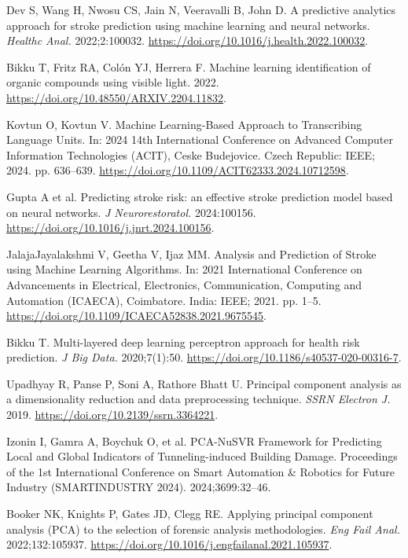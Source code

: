 \begin{enumerate}[label={[\arabic*]},leftmargin=1.2cm]
\item \hypertarget{bib:1}{}Dev S, Wang H, Nwosu CS, Jain N, Veeravalli B, John D. A predictive analytics approach for stroke prediction using machine learning and neural networks. \textit{Healthc Anal.} 2022;2:100032. \url{https://doi.org/10.1016/j.health.2022.100032}.
\item \hypertarget{bib:2}{}Bikku T, Fritz RA, Colón YJ, Herrera F. Machine learning identification of organic compounds using visible light. 2022. \url{https://doi.org/10.48550/ARXIV.2204.11832}.
\item \hypertarget{bib:3}{}Kovtun O, Kovtun V. Machine Learning-Based Approach to Transcribing Language Units. In: 2024 14th International Conference on Advanced Computer Information Technologies (ACIT), Ceske Budejovice. Czech Republic: IEEE; 2024. pp. 636--639. \url{https://doi.org/10.1109/ACIT62333.2024.10712598}.
\item \hypertarget{bib:4}{}Gupta A et al. Predicting stroke risk: an effective stroke prediction model based on neural networks. \textit{J Neurorestoratol.} 2024:100156. \url{https://doi.org/10.1016/j.jnrt.2024.100156}.
\item \hypertarget{bib:5}{}JalajaJayalakshmi V, Geetha V, Ijaz MM. Analysis and Prediction of Stroke using Machine Learning Algorithms. In: 2021 International Conference on Advancements in Electrical, Electronics, Communication, Computing and Automation (ICAECA), Coimbatore. India: IEEE; 2021. pp. 1--5. \url{https://doi.org/10.1109/ICAECA52838.2021.9675545}.
\item \hypertarget{bib:6}{}Bikku T. Multi-layered deep learning perceptron approach for health risk prediction. \textit{J Big Data.} 2020;7(1):50. \url{https://doi.org/10.1186/s40537-020-00316-7}.
\item \hypertarget{bib:7}{}Upadhyay R, Panse P, Soni A, Rathore Bhatt U. Principal component analysis as a dimensionality reduction and data preprocessing technique. \textit{SSRN Electron J.} 2019. \url{https://doi.org/10.2139/ssrn.3364221}.
\item \hypertarget{bib:8}{}Izonin I, Gamra A, Boychuk O, et al. PCA-NuSVR Framework for Predicting Local and Global Indicators of Tunneling-induced Building Damage. Proceedings of the 1st International Conference on Smart Automation \& Robotics for Future Industry (SMARTINDUSTRY 2024). 2024;3699:32--46.
\item \hypertarget{bib:9}{}Booker NK, Knights P, Gates JD, Clegg RE. Applying principal component analysis (PCA) to the selection of forensic analysis methodologies. \textit{Eng Fail Anal.} 2022;132:105937. \url{https://doi.org/10.1016/j.engfailanal.2021.105937}.

\end{enumerate}
